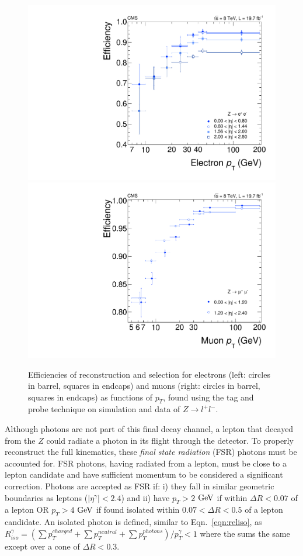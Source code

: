 \begin{figure}[htbp]
\begin{center}
\includegraphics[width=.45\linewidth]{HiggsDiscovery/figures/electron_efficiency.pdf}
\includegraphics[width=.45\linewidth]{HiggsDiscovery/figures/muon_efficiency.pdf}
\caption[Overall Efficiencies of Electron and Muon Reconstruction and Selection in $4l$ Analysis]{Efficiencies of reconstruction and selection for electrons (left: circles in barrel, squares in endcaps) and muons (right: circles in barrel, squares in endcaps) as functions of $p_T$, found using the tag and probe technique on simulation and data of $Z\rightarrow l^+l^-$. }
\label{fig:LeptonEfficiencies}
\end{center}
\end{figure}


Although photons are not part of this final decay channel, a lepton that decayed from the $Z$ could radiate a photon in its flight through the detector. To properly reconstruct the full kinematics, these \textit{final state radiation} (FSR) photons must be accounted for. FSR photons, having radiated from a lepton, must be close to a lepton candidate and have sufficient momentum to be considered a significant correction. Photons are accepted as FSR if: i) they fall in similar geometric boundaries as leptons ($|\eta^\gamma|<2.4$) and ii) have $p_T>2$ $\rm{GeV}$ if within $\Delta R < 0.07$ of a lepton OR $p_T>4$ $\rm{GeV}$ if found isolated within $0.07 < \Delta R < 0.5$ of a lepton candidate. An isolated photon is defined, similar to Eqn.~\ref{eqn:reliso}, as $R_{iso}^{\gamma} = (\sum p_T^{charged} + \sum p_T^{neutral} + \sum p_T^{photons})/p_T^\gamma < 1$ where the sums the same except over a cone of $\Delta R < 0.3$.


